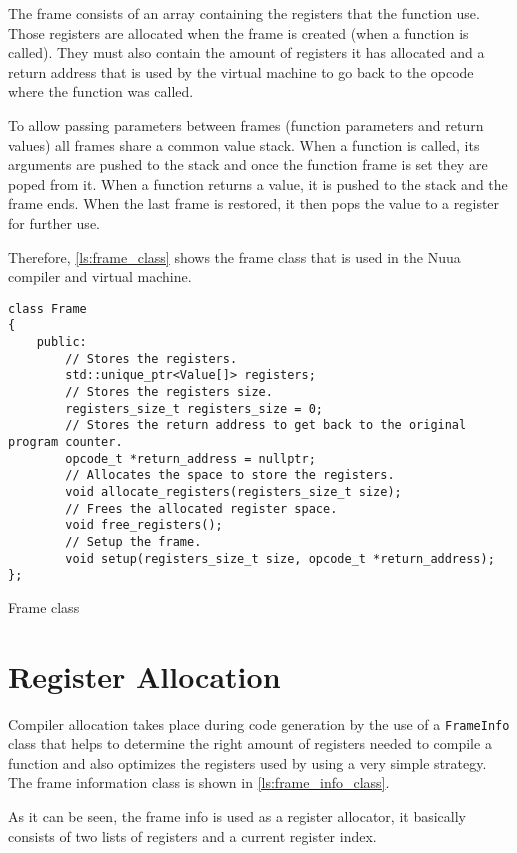 The frame consists of an array containing the registers that the function use. Those registers are allocated when the frame is created (when a function is called).
They must also contain the amount of registers it has allocated and a return address that is used by the virtual machine to go back to the opcode where the function was called.

To allow passing parameters between frames (function parameters and return values) all frames share a common value stack. When a function is called, its arguments
are pushed to the stack and once the function frame is set they are poped from it. When a function returns a value, it is pushed to the stack and the frame ends.
When the last frame is restored, it then pops the value to a register for further use.

Therefore, \autoref{ls:frame_class} shows the frame class that is used in the Nuua compiler and virtual machine.

\begin{listing}[H]
\begin{verbatim}
class Frame
{
    public:
        // Stores the registers.
        std::unique_ptr<Value[]> registers;
        // Stores the registers size.
        registers_size_t registers_size = 0;
        // Stores the return address to get back to the original program counter.
        opcode_t *return_address = nullptr;
        // Allocates the space to store the registers.
        void allocate_registers(registers_size_t size);
        // Frees the allocated register space.
        void free_registers();
        // Setup the frame.
        void setup(registers_size_t size, opcode_t *return_address);
};
\end{verbatim}
\caption{Frame class}
\label{ls:frame_class}
\end{listing}

\section{Register Allocation}

Compiler allocation takes place during code generation by the use of a \texttt{FrameInfo} class that helps to determine the right amount of registers needed
to compile a function and also optimizes the registers used by using a very simple strategy. The frame information class is shown in \autoref{ls:frame_info_class}.

As it can be seen, the frame info is used as a register allocator, it basically consists of two lists of registers and a current register index.

